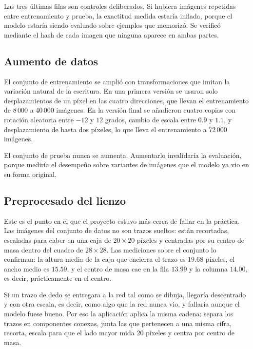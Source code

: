 \documentclass[12pt,letterpaper]{article}
\begin{document}
Las tres últimas filas son controles deliberados. Si hubiera imágenes repetidas
entre entrenamiento y prueba, la exactitud medida estaría inflada, porque el modelo
estaría siendo evaluado sobre ejemplos que memorizó. Se verificó mediante el hash
de cada imagen que ninguna aparece en ambas partes.

\subsection{Aumento de datos}
\label{sec:aumento}

El conjunto de entrenamiento se amplió con transformaciones que imitan la variación
natural de la escritura. En una primera versión se usaron solo desplazamientos de
un píxel en las cuatro direcciones, que llevan el entrenamiento de 8\,000 a
40\,000 imágenes. En la versión final se añadieron cuatro copias con rotación
aleatoria entre $-12$ y $12$ grados, cambio de escala entre $0.9$ y $1.1$, y
desplazamiento de hasta dos píxeles, lo que lleva el entrenamiento a 72\,000
imágenes.

El conjunto de prueba nunca se aumenta. Aumentarlo invalidaría la evaluación, porque
mediría el desempeño sobre variantes de imágenes que el modelo ya vio en su forma
original.

\subsection{Preprocesado del lienzo}
\label{sec:preprocesado}

Este es el punto en el que el proyecto estuvo más cerca de fallar en la práctica.
Las imágenes del conjunto de datos no son trazos sueltos: están recortadas,
escaladas para caber en una caja de $20\times20$ píxeles y centradas por su centro
de masa dentro del cuadro de $28\times28$. Las mediciones sobre el conjunto lo
confirman: la altura media de la caja que encierra el trazo es $19.68$ píxeles, el
ancho medio es $15.59$, y el centro de masa cae en la fila $13.99$ y la columna
$14.00$, es decir, prácticamente en el centro.

Si un trazo de dedo se entregara a la red tal como se dibuja, llegaría descentrado
y con otra escala, es decir, como algo que la red nunca vio, y fallaría aunque el
modelo fuese bueno. Por eso la aplicación aplica la misma cadena: separa los trazos
en componentes conexas, junta las que pertenecen a una misma cifra, recorta, escala
para que el lado mayor mida 20 píxeles y centra por centro de masa.
\end{document}
